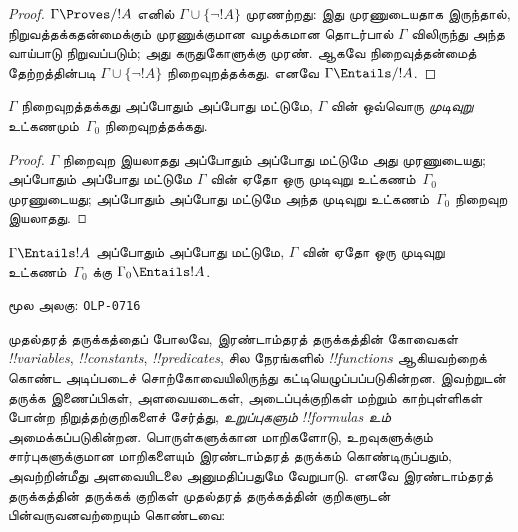 \documentclass[11pt,a4paper,openany]{memoir}
\begin{document}
\begin{proof}
$\Gamma\Proves/ !A$ எனில்
$\Gamma \cup \{\lnot !A\}$ முரணற்றது:
இது முரணுடையதாக இருந்தால், நிறுவத்தக்கதன்மைக்கும்
முரணுக்குமான வழக்கமான தொடர்பால் $\Gamma$ விலிருந்து
அந்த வாய்பாடு நிறுவப்படும்; அது கருதுகோளுக்கு முரண்.
ஆகவே நிறைவுத்தன்மைத் தேற்றத்தின்படி
$\Gamma \cup \{\lnot !A\}$ நிறைவுறத்தக்கது.
எனவே $\Gamma \Entails/ !A$.
\end{proof}

\begin{prop}[இறுக்கத்தன்மைத் தேற்றம்]
$\Gamma$ நிறைவுறத்தக்கது அப்போதும் அப்போது
மட்டுமே, $\Gamma$ வின் ஒவ்வொரு
\emph{முடிவுறு} உட்கணமும்~$\Gamma_0$
நிறைவுறத்தக்கது.
\end{prop}

\begin{proof}
$\Gamma$ நிறைவுற இயலாதது அப்போதும் அப்போது
மட்டுமே அது முரணுடையது; அப்போதும் அப்போது
மட்டுமே $\Gamma$ வின் ஏதோ ஒரு முடிவுறு
உட்கணம்~$\Gamma_0$ முரணுடையது; அப்போதும்
அப்போது மட்டுமே அந்த முடிவுறு
உட்கணம்~$\Gamma_0$ நிறைவுற இயலாதது.
\end{proof}

\begin{cor}
$\Gamma \Entails !A$ அப்போதும் அப்போது
மட்டுமே, $\Gamma$ வின் ஏதோ ஒரு முடிவுறு
உட்கணம்~$\Gamma_0$ க்கு
$\Gamma_0 \Entails !A$.
\end{cor}



\clearpage
\noindent மூல அலகு: \texttt{OLP-0716}\par





முதல்தரத் தருக்கத்தைப் போலவே, இரண்டாம்தரத் தருக்கத்தின் கோவைகள்
\emph{!!{variable}s}, \emph{!!{constant}s}, \emph{!!{predicate}s},
சில நேரங்களில் \emph{!!{function}s} ஆகியவற்றைக் கொண்ட அடிப்படைச்
சொற்கோவையிலிருந்து கட்டியெழுப்பப்படுகின்றன. இவற்றுடன் தருக்க
இணைப்பிகள், அளவையடைகள், அடைப்புக்குறிகள் மற்றும் காற்புள்ளிகள் போன்ற
நிறுத்தற்குறிகளைச் சேர்த்து, \emph{உறுப்புகளும்}
\emph{!!{formula}s உம்} அமைக்கப்படுகின்றன. பொருள்களுக்கான மாறிகளோடு,
உறவுகளுக்கும் சார்புகளுக்குமான மாறிகளையும் இரண்டாம்தரத் தருக்கம்
கொண்டிருப்பதும், அவற்றின்மீது அளவையிடலை அனுமதிப்பதுமே வேறுபாடு.
எனவே இரண்டாம்தரத் தருக்கத்தின் தருக்கக் குறிகள் முதல்தரத்
தருக்கத்தின் குறிகளுடன் பின்வருவனவற்றையும் கொண்டவை:
\end{document}
